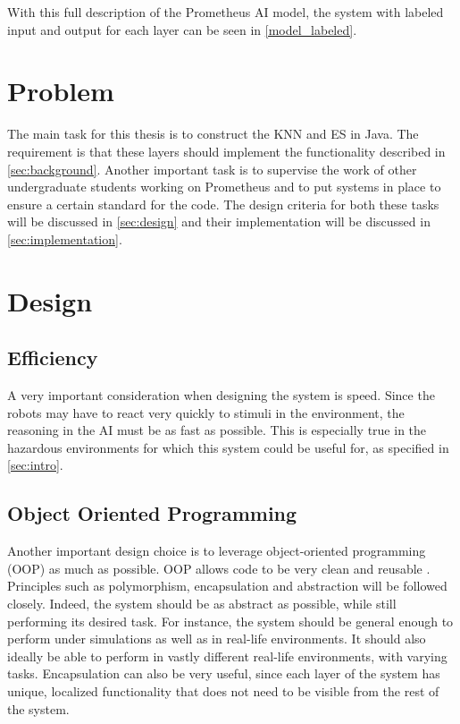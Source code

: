 \documentclass[titlepage,11pt]{article}
\begin{document}
With this full description of the Prometheus AI model, the system with labeled input and output for each layer can be seen in \autoref{model_labeled}.

\section{Problem}
\label{sec:problem}

The main task for this thesis is to construct the KNN and ES in Java. The requirement is that these layers should implement the functionality described in \autoref{sec:background}. Another important task is to supervise the work of other undergraduate students working on Prometheus and to put systems in place to ensure a certain standard for the code. The design criteria for both these tasks will be discussed in \autoref{sec:design} and their implementation will be discussed in \cref{sec:implementation}.

\section{Design}
\label{sec:design}

\subsection{Efficiency}
A very important consideration when designing the system is speed. Since the robots may have to react very quickly to stimuli in the environment, the reasoning in the AI must be as fast as possible. This is especially true in the hazardous environments for which this system could be useful for, as specified in \autoref{sec:intro}.

\subsection{Object Oriented Programming}
Another important design choice is to leverage object-oriented programming (OOP) as much as possible. OOP allows code to be very clean and reusable \cite{oop}. Principles such as polymorphism, encapsulation and abstraction will be followed closely. Indeed, the system should be as abstract as possible, while still performing its desired task. For instance, the system should be general enough to perform under simulations as well as in real-life environments. It should also ideally be able to perform in vastly different real-life environments, with varying tasks. Encapsulation can also be very useful, since each layer of the system has unique, localized functionality that does not need to be visible from the rest of the system.
\end{document}
